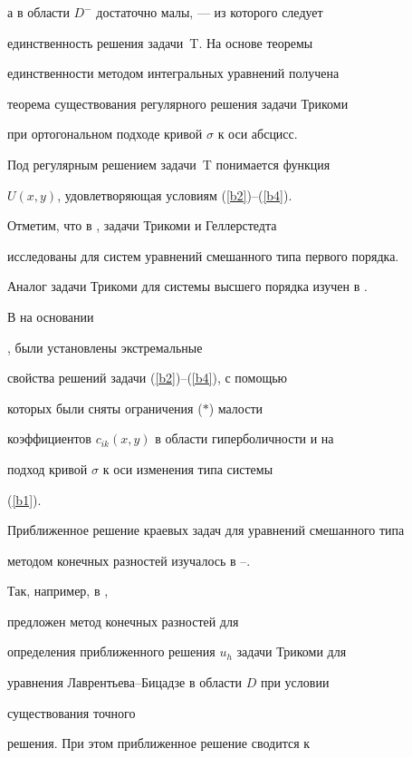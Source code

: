 а в области $D^-$ достаточно малы, --- из которого следует


единственность решения задачи~T. На основе теоремы


единственности методом интегральных уравнений получена


теорема существования регулярного решения задачи Трикоми


при ортогональном подходе кривой $\sigma$ к оси абсцисс.


Под регулярным решением задачи~T понимается функция


$U(x,y)$, удовлетворяющая условиям (\ref{b2})--(\ref{b4}).





Отметим, что в \cite{5_1}, \cite{8} задачи Трикоми и Геллерстедта


исследованы для систем уравнений смешанного типа первого порядка.


Аналог задачи Трикоми для системы высшего порядка изучен в \cite{9}.





В \cite{SM_SMZ} на основании


\cite{Sabitov}, \cite{21} были установлены экстремальные


свойства решений задачи (\ref{b2})--(\ref{b4}), с помощью


которых были сняты ограничения ($\ast$) малости


коэффициентов $c_{ik}(x,y)$ в области гиперболичности и на


подход кривой $\sigma$ к оси изменения типа системы


(\ref{b1}).





Приближенное решение краевых задач для уравнений смешанного типа


методом конечных разностей изучалось в \cite{Halilov}--\cite{Tagiev3}.


Так, например, в \cite{Halilov}, \cite{Karmanov1}


предложен метод конечных разностей для


определения приближенного решения $u_h$ задачи Трикоми для


уравнения Лаврентьева--Бицадзе в области $D$ при условии


существования точного


решения. При этом приближенное решение сводится к


